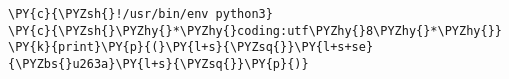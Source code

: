 \begin{Verbatim}[commandchars=\\\{\}]
\PY{c}{\PYZsh{}!/usr/bin/env python3}
\PY{c}{\PYZsh{}\PYZhy{}*\PYZhy{}coding:utf\PYZhy{}8\PYZhy{}*\PYZhy{}}
\PY{k}{print}\PY{p}{(}\PY{l+s}{\PYZsq{}}\PY{l+s+se}{\PYZbs{}u263a}\PY{l+s}{\PYZsq{}}\PY{p}{)}
\end{Verbatim}

